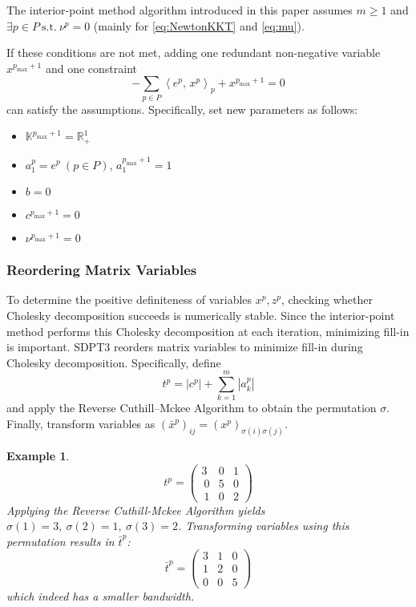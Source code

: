 \documentclass{scrartcl}
\newtheorem{example}{Example}
\newcommand{\inprod}[2]{\left\langle #1, \, #2 \right\rangle}
\begin{document}
The interior-point method algorithm introduced in this paper assumes $m \geq 1$ and $\exists p\in P ~ \text{s.t.} ~ \nu^p=0$ (mainly for \eqref{eq:NewtonKKT} and \eqref{eq:mu}).

If these conditions are not met, adding one redundant non-negative variable $x^{p_{\max} + 1}$ and one constraint
\[
  -\sum_{p\in P} \inprod{e^p}{x^p}_p + x^{p_{\max} + 1} = 0
\]
can satisfy the assumptions.
Specifically, set new parameters as follows:
\begin{itemize}
    \item $\mathbb{K}^{p_{\max} + 1} = \mathbb{R}^1_+$
    \item $a^{p}_1=e^p ~ (p \in P)$, $a^{p_{\max} + 1}_1 = 1$
    \item $b = 0$
    \item $c^{p_{\max} +1}=0$
    \item $\nu^{p_{\max} + 1} = 0$
\end{itemize}

\subsubsection{Reordering Matrix Variables}
To determine the positive definiteness of variables $x^p, z^p$, checking whether Cholesky decomposition succeeds is numerically stable.
Since the interior-point method performs this Cholesky decomposition at each iteration, minimizing fill-in is important.
SDPT3 reorders matrix variables to minimize fill-in during Cholesky decomposition.
Specifically, define
\[
  t^p = |c^p| + \sum_{k=1}^m |a^p_k|
\]
and apply the Reverse Cuthill--Mckee Algorithm to obtain the permutation $\sigma$.
Finally, transform variables as $(\bar{x}^p)_{ij} = (x^p)_{\sigma(i)\sigma(j)}$.

\begin{example}
\[
    t^p = \begin{pmatrix}
        3 & 0 & 1 \\\
        0 & 5 & 0 \\\
        1 & 0 & 2
    \end{pmatrix}
\] Applying the Reverse Cuthill-Mckee Algorithm yields $\sigma(1)=3, ~ \sigma(2)=1, ~ \sigma(3)=2$.
Transforming variables using this permutation results in $\bar{t}^p$:
\[
    \bar{t}^p = \begin{pmatrix}
        3 & 1 & 0 \\
        1 & 2 & 0 \\
        0 & 0 & 5
    \end{pmatrix}
\]
which indeed has a smaller bandwidth.
\end{example}
\end{document}
